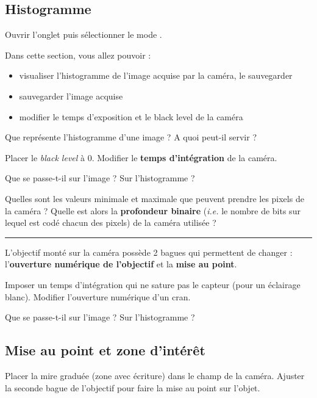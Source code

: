 \subsection{Histogramme}

\Manip Ouvrir l'onglet  puis sélectionner le mode .

\medskip

Dans cette section, vous allez pouvoir :

\begin{itemize}
	\item visualiser l'histogramme de l'image acquise par la caméra, le sauvegarder
	\item sauvegarder l'image acquise
	\item modifier le temps d'exposition et le black level de la caméra
\end{itemize}

\medskip

\Quest Que représente l'histogramme d'une image ? A quoi peut-il servir ?

\Manip Placer le \textit{black level} à 0. Modifier le \textbf{temps d'intégration} de la caméra. 

\Quest Que se passe-t-il sur l'image ? Sur l'histogramme ?

\Quest Quelles sont les valeurs minimale et maximale que peuvent prendre les pixels de la caméra ? Quelle est alors la \textbf{profondeur binaire} (\textit{i.e.} le nombre de bits sur lequel est codé chacun des pixels) de la caméra utilisée ?

\noindent \rule{\linewidth}{1pt}

L'objectif monté sur la caméra possède 2 bagues qui permettent de changer : l'\textbf{ouverture numérique de l'objectif} et la \textbf{mise au point}.

\Manip Imposer un temps d'intégration qui ne sature pas le capteur (pour un éclairage blanc). Modifier l'ouverture numérique d'un cran. 

\Quest Que se passe-t-il sur l'image ? Sur l'histogramme ?


\subsection{Mise au point et zone d'intérêt}

\Manip Placer la mire graduée (zone avec écriture) dans le champ de la caméra. Ajuster la seconde bague de l'objectif pour faire la mise au point sur l'objet.

